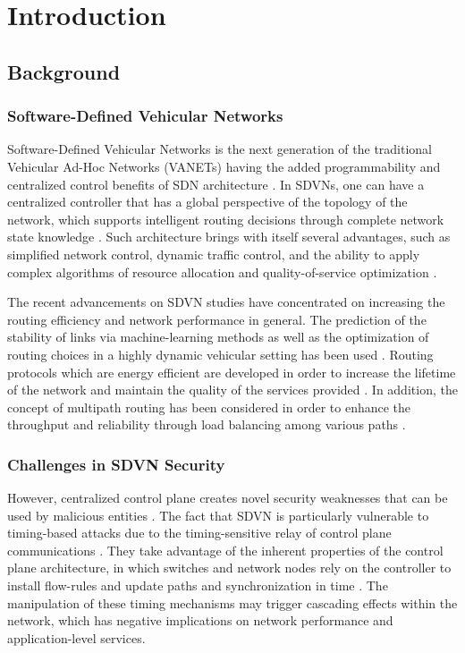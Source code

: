 \section{Introduction}

\subsection{Background}

\subsubsection{Software-Defined Vehicular Networks}

Software-Defined Vehicular Networks is the next generation of the traditional Vehicular Ad-Hoc Networks (VANETs) having the added programmability and centralized control benefits of SDN architecture \cite{islam2021software}. In SDVNs, one can have a centralized controller that has a global perspective of the topology of the network, which supports intelligent routing decisions through complete network state knowledge \cite{abugabah2020intelligent}. Such architecture brings with itself several advantages, such as simplified network control, dynamic traffic control, and the ability to apply complex algorithms of resource allocation and quality-of-service optimization \cite{he2016cost, gao2018hierarchical}.

The recent advancements on SDVN studies have concentrated on increasing the routing efficiency and network performance in general. The prediction of the stability of links via machine-learning methods as well as the optimization of routing choices in a highly dynamic vehicular setting has been used \cite{wijesekara2023machine}. Routing protocols which are energy efficient are developed in order to increase the lifetime of the network and maintain the quality of the services provided \cite{renuka2021sdn, e2024improving}. In addition, the concept of multipath routing has been considered in order to enhance the throughput and reliability through load balancing among various paths \cite{awad2021machine, yan2018improving, wijesekara2025qlpmr}.

\subsubsection{Challenges in SDVN Security}

However, centralized control plane creates novel security weaknesses that can be used by malicious entities \cite{Xu2015Race}. The fact that SDVN is particularly vulnerable to timing-based attacks due to the timing-sensitive relay of control plane communications \cite{Shoaib2021Timing, Arif2019Timing}. They take advantage of the inherent properties of the control plane architecture, in which switches and network nodes rely on the controller to install flow-rules and update paths and synchronization in time \cite{Cao2018CrossPath}. The manipulation of these timing mechanisms may trigger cascading effects within the network, which has negative implications on network performance and application-level services.

